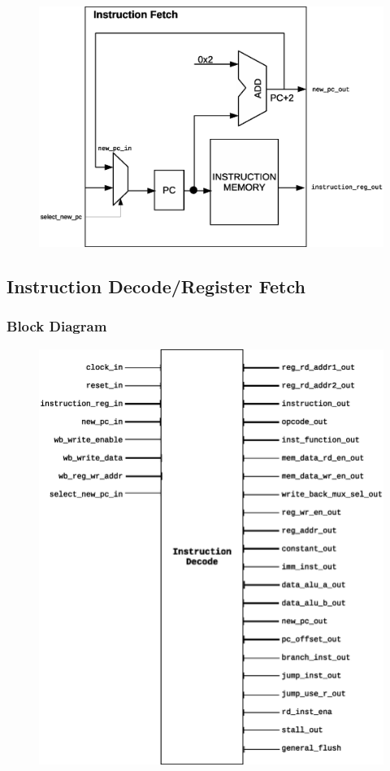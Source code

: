 \documentclass{article}
\begin{document}
  \begin{figure}[H]
    \centering
    \includegraphics[width=\linewidth]{pictures/datapath/if_datapath.eps}
  \end{figure}   

  \newpage
  \subsection{Instruction Decode/Register Fetch}
  \subsubsection{Block Diagram}
  \begin{figure}[H]
    \centering
    \includegraphics[width=.8\linewidth]{pictures/blocks/id_block.eps}
  \end{figure} 
  
\end{document}
